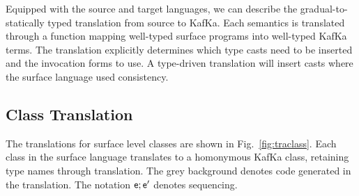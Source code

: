 \documentclass[a4paper,UKenglish]{lipics-v2018}
\newcommand{\EM}[1]{\ensuremath{#1}\xspace}
\newcommand{\figref}[1]{Fig.~\ref{#1}\xspace}
\newcommand{\kafka}{{\sf KafKa}\xspace}
\begin{document}
\vspace{-7mm}

\noindent Equipped with the source and target languages, we can describe
the gradual-to-statically typed translation from source to \kafka.
Each semantics is translated through a function mapping well-typed
surface programs into well-typed \kafka terms. The translation
explicitly determines which type casts need to be inserted and the
invocation forms to use. A type-driven translation will insert casts
where the surface language used consistency.

\subsection{Class Translation}

The translations for surface level classes are shown in
\figref{fig:traclass}. Each class in the surface language translates to a
homonymous \kafka class, retaining type names through translation.
The grey background denotes code generated in the translation.
The notation \EM{\e;\ep} denotes sequencing. 
\end{document}
